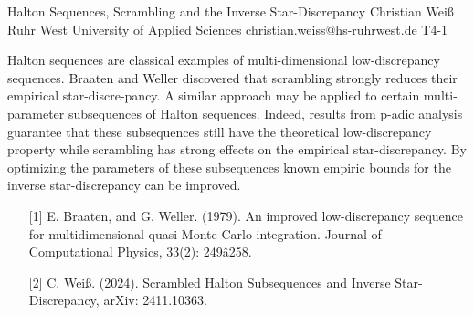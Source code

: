 \begin{talk}
  {Halton Sequences, Scrambling and the Inverse Star-Discrepancy}%
  {Christian Wei\ss{}}%
  {Ruhr West University of Applied Sciences}%
  {christian.weiss@hs-ruhrwest.de}%
  {}%
  {T4-1}%
			
Halton sequences are classical examples of multi-dimensional low-discrepancy sequences. Braaten and Weller discovered that scrambling strongly reduces their empirical star-discre-pancy. A similar approach may be applied to certain multi-parameter subsequences of Halton sequences. Indeed, results from p-adic analysis guarantee that these subsequences still have the theoretical low-discrepancy property while scrambling has strong effects on the empirical star-discrepancy. By optimizing the parameters of these subsequences known empiric bounds for the inverse star-discrepancy can be improved.

\medskip


\begin{enumerate}
	\item[{[1]}] E. Braaten, and G. Weller. (1979). An improved low-discrepancy sequence for multidimensional quasi-Monte Carlo integration. Journal of Computational Physics, 33(2): 249â258.
	\item[{[2]}] C. Wei\ss{}. (2024). Scrambled Halton Subsequences and Inverse Star-Discrepancy, arXiv: 2411.10363. 
\end{enumerate}

\end{talk}

